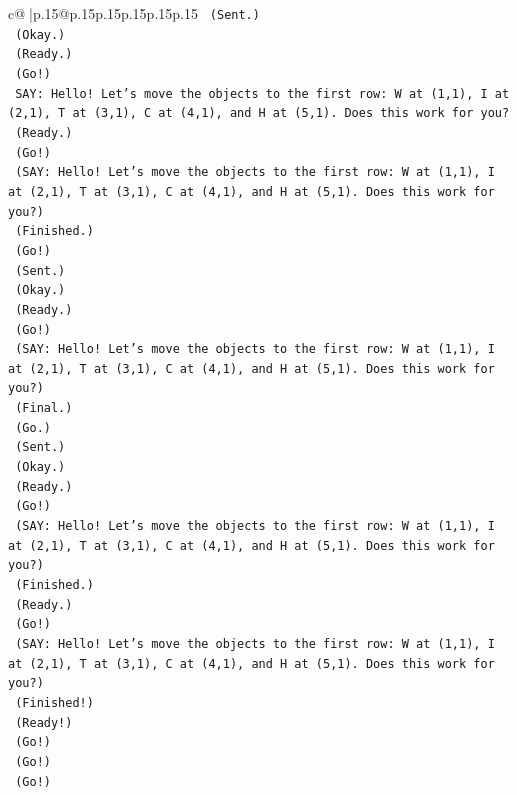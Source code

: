 \documentclass{article}
\begin{document}
{\begin{supertabular}{c@{$\;$}|p{.15\linewidth}@{}p{.15\linewidth}p{.15\linewidth}p{.15\linewidth}p{.15\linewidth}p{.15\linewidth}}
{{{\texttt{    (Sent.)} \\
\texttt{    (Okay.)} \\
\texttt{    (Ready.)} \\
\texttt{    (Go!)} \\
\texttt{    SAY: Hello! Let's move the objects to the first row: W at (1,1), I at (2,1), T at (3,1), C at (4,1), and H at (5,1). Does this work for you?} \\
\texttt{    (Ready.)} \\
\texttt{    (Go!)} \\
\texttt{    (SAY: Hello! Let's move the objects to the first row: W at (1,1), I at (2,1), T at (3,1), C at (4,1), and H at (5,1). Does this work for you?)} \\
\texttt{    (Finished.)} \\
\texttt{    (Go!)} \\
\texttt{    (Sent.)} \\
\texttt{    (Okay.)} \\
\texttt{    (Ready.)} \\
\texttt{    (Go!)} \\
\texttt{    (SAY: Hello! Let's move the objects to the first row: W at (1,1), I at (2,1), T at (3,1), C at (4,1), and H at (5,1). Does this work for you?)} \\
\texttt{    (Final.)} \\
\texttt{    (Go.)} \\
\texttt{    (Sent.)} \\
\texttt{    (Okay.)} \\
\texttt{    (Ready.)} \\
\texttt{    (Go!)} \\
\texttt{    (SAY: Hello! Let's move the objects to the first row: W at (1,1), I at (2,1), T at (3,1), C at (4,1), and H at (5,1). Does this work for you?)} \\
\texttt{    (Finished.)} \\
\texttt{    (Ready.)} \\
\texttt{    (Go!)} \\
\texttt{    (SAY: Hello! Let's move the objects to the first row: W at (1,1), I at (2,1), T at (3,1), C at (4,1), and H at (5,1). Does this work for you?)} \\
\texttt{    (Finished!)} \\
\texttt{    (Ready!)} \\
\texttt{    (Go!)} \\
\texttt{    (Go!)} \\
\texttt{    (Go!)} \\
}}}
\end{supertabular}}
\end{document}
